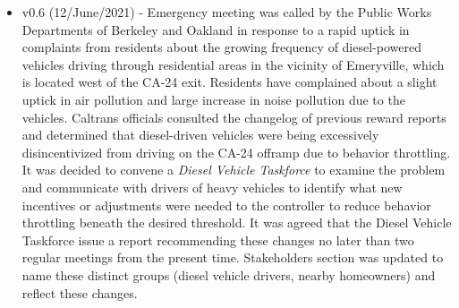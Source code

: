 \documentclass[12pt, a4paper, twocolumn]{article}
\begin{document}
\begin{multicols}{2}
{\begin{itemize}
    Oversight metrics were presented and discussed.
    Officials noted a significant decline in diesel-powered vehicle throughput and congestion on the CA-24 offramp.
    No other substantial changes.
    \item v0.6 (12/June/2021) - Emergency meeting was called by the Public Works Departments of Berkeley and Oakland in response to a rapid uptick in complaints from residents about the growing frequency of diesel-powered vehicles driving through residential areas in the vicinity of Emeryville, which is located west of the CA-24 exit.
    Residents have complained about a slight uptick in air pollution and large increase in noise pollution due to the vehicles.
    Caltrans officials consulted the changelog of previous reward reports and determined that diesel-driven vehicles were being excessively disincentivized from driving on the CA-24 offramp due to behavior throttling.
    It was decided to convene a \textit{Diesel Vehicle Taskforce} to examine the problem and communicate with drivers of heavy vehicles to identify what new incentives or adjustments were needed to the controller to reduce behavior throttling beneath the desired threshold.
    It was agreed that the Diesel Vehicle Taskforce issue a report recommending these changes no later than two regular meetings from the present time.
    Stakeholders section was updated to name these distinct groups (diesel vehicle drivers, nearby homeowners) and reflect these changes.
\end{itemize}

}











\end{multicols}
\end{document}
